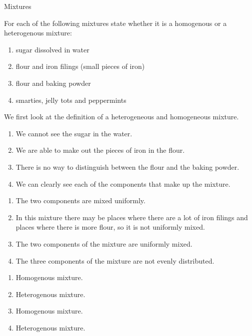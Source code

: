       \begin{wex}{Mixtures}
{For each of the following mixtures state whether it is a homogenous or a heterogenous mixture:
\label{m38708*eip-id1167649056231}\begin{enumerate}[noitemsep, label=\textbf{\alph*}. ] 
            \leftskip=20pt\rightskip=\leftskip\item sugar dissolved in water
\item flour and iron filings (small pieces of iron)
\item flour and baking powder\item smarties, jelly tots and peppermints\end{enumerate} }
{
We first look at the definition of a heterogeneous and homogeneous mixture.
\begin{enumerate}[noitemsep, label=\textbf{\alph*}. ] 
\item We cannot see the sugar in the water.
\item We are able to make out the pieces of iron in the flour.
\item There is no way to distinguish between the flour and the baking powder.
\item We can clearly see each of the components that make up the mixture. \end{enumerate}
\begin{enumerate}[noitemsep, label=\textbf{\alph*}. ] 
\item The two components are mixed uniformly.
\item In this mixture there may be places where there are a lot of iron filings and places where there is more flour, so it is not uniformly mixed.
\item The two components of the mixture are uniformly mixed.
\item The three components of the mixture are not evenly distributed.\end{enumerate}
\begin{enumerate}[noitemsep, label=\textbf{\alph*}. ] 
\item Homogenous mixture.
\item Heterogenous mixture.
\item Homogenous mixture.
\item Heterogenous mixture.\end{enumerate}}
    \end{wex}
 

